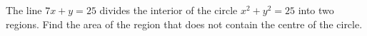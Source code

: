 The line $7x+y=25$ divides the interior of the circle $x^2+y^2=25$ into two regions. Find the area of the region that does not contain the centre of the circle.
